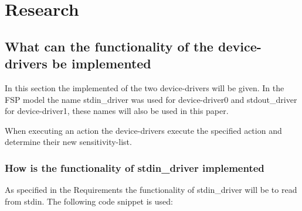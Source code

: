 \hypertarget{research}{%
\section{Research}\label{research}}

\hypertarget{what-can-the-functionality-of-the-device-drivers-be-implemented}{%
\subsection{What can the functionality of the device-drivers be
implemented}\label{what-can-the-functionality-of-the-device-drivers-be-implemented}}

In this section the implemented of the two device-drivers will be given.
In the FSP model the name stdin\_driver was used for device-driver0 and
stdout\_driver for device-driver1, these names will also be used in this
paper.

When executing an action the device-drivers execute the specified action
and determine their new sensitivity-list.

\hypertarget{how-is-the-functionality-of-stdin_driver-implemented}{%
\subsubsection{How is the functionality of stdin\_driver
implemented}\label{how-is-the-functionality-of-stdin_driver-implemented}}

As specified in the Requirements the functionality of stdin\_driver will
be to read from stdin. The following code snippet is used:


